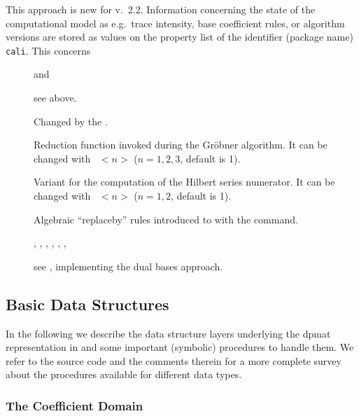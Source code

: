 This approach is new for v.~2.2. Information concerning the state of
the computational model as e.g.\ trace intensity, base coefficient
rules, or algorithm versions are stored as values on the property list
of the identifier (package name) \texttt{cali}. This concerns
\begin{description}
\item[] and 

  see above.

\item[]

  Changed by the .

\item[]

  Reduction function invoked during the Gr\"obner algorithm. It can be
changed with \ $<n>$ ($n=1,2,3$, default is 1).

\item[]

  Variant for the computation of the Hilbert series numerator. It
can be changed with \ $<n>$ ($n=1,2$, default is 1).

\item[]

  Algebraic ``replaceby'' rules introduced to  with the
 command.

\item[], , , ,
, , 

see , implementing the dual bases approach.
\end{description}


\subsection{Basic Data Structures}

In the following we describe the data structure layers underlying the
dpmat representation in  and some important (symbolic) procedures
to handle them. We refer to the source code and the comments therein for
a more complete survey about the procedures available for different
data types.

\subsubsection{The Coefficient Domain}

